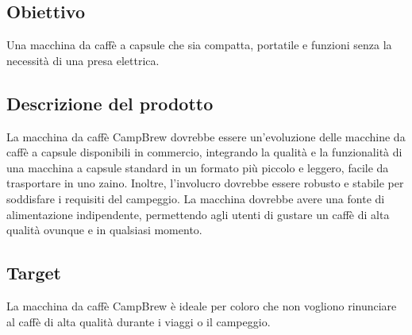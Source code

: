 \documentclass{article}
\begin{document}
\subsection{Obiettivo}
Una macchina da caffè a capsule che sia compatta, portatile e funzioni senza la necessità di una presa elettrica.

\subsection{Descrizione del prodotto}
La macchina da caffè CampBrew dovrebbe essere un'evoluzione delle macchine da caffè a capsule disponibili in commercio, integrando la qualità e la funzionalità di una macchina a capsule standard in un formato più piccolo e leggero, facile da trasportare in uno zaino. Inoltre, l'involucro dovrebbe essere robusto e stabile per soddisfare i requisiti del campeggio. La macchina dovrebbe avere una fonte di alimentazione indipendente, permettendo agli utenti di gustare un caffè di alta qualità ovunque e in qualsiasi momento.

\subsection{Target}
La macchina da caffè CampBrew è ideale per coloro che non vogliono rinunciare al caffè di alta qualità durante i viaggi o il campeggio.
\end{document}
